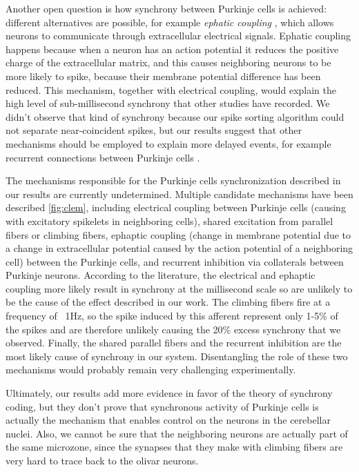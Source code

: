 Another open question is how synchrony between Purkinje cells is achieved: different alternatives are possible, for example \emph{ephatic coupling} \cite{han2018ephaptic}, which allows neurons to communicate through extracellular electrical signals. Ephatic coupling happens because when a neuron has an action potential it reduces the positive charge of the extracellular matrix, and this causes neighboring neurons to be more likely to spike, because their membrane potential difference has been reduced. This mechanism, together with electrical coupling, would explain the high level of sub-millisecond synchrony that other studies have recorded. We didn't observe that kind of synchrony because our spike sorting algorithm could not separate near-coincident spikes, but our results suggest that other mechanisms should be employed to explain more delayed events, for example recurrent connections between Purkinje cells \cite{de2008high}.

The mechanisms responsible for the Purkinje cells synchronization described in our results are currently undetermined. Multiple candidate mechanisms have been described \cite{person2012synchrony} \ref{fig:clem}, including electrical coupling between Purkinje cells (causing with excitatory spikelets in neighboring cells), shared excitation from parallel fibers or climbing fibers, ephaptic coupling (change in membrane potential due to a change in extracellular potential caused by the action potential of a neighboring cell) between the Purkinje cells, and recurrent inhibition via collaterals between Purkinje neurons. According to the literature, the electrical and ephaptic coupling more likely result in synchrony at the millisecond scale so are unlikely to be the cause of the effect described in our work. The climbing fibers fire at a frequency of ~1Hz, so the spike induced by this afferent represent only 1-5\% of the spikes and are therefore unlikely causing the 20\% excess synchrony that we observed. Finally, the shared parallel fibers and the recurrent inhibition are the most likely cause of synchrony in our system. Disentangling the role of these two mechanisms would probably remain very challenging experimentally.

Ultimately, our results add more evidence in favor of the theory of synchrony coding, but they don't prove that synchronous activity of Purkinje cells is actually the mechanism that enables control on the neurons in the cerebellar nuclei. Also, we cannot be sure that the neighboring neurons are actually part of the same microzone, since the synapses that they make with climbing fibers are very hard to trace back to the olivar neurons.

